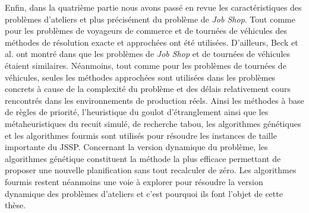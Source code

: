 Enfin, dans la quatrième partie nous avons passé en revue les caractéristiques des problèmes d'ateliers et plus précisément du problème de \textit{Job Shop}. Tout comme pour les problèmes de voyageurs de commerce et de tournées de véhicules des méthodes de résolution exacte et approchées ont été utilisées. D'ailleurs, Beck et al. ont montré dans \cite{Beck2003} que les problèmes de \textit{Job Shop} et de tournées de véhicules étaient similaires. Néanmoins, tout comme pour les problèmes de tournées de véhicules, seules les méthodes approchées sont utilisées dans les problèmes concrets à cause de la complexité du problème et des délais relativement cours rencontrés dans les environnements de production réels.
Ainsi les méthodes à base de règles de priorité, l'heuristique du goulot d'étranglement ainsi que les métaheuristiques du recuit simulé, de recherche tabou, les algorithmes génétiques et les algorithmes fourmis sont utilisés pour résoudre les instances de taille importante du JSSP.
Concernant la version dynamique du problème, les algorithmes génétique constituent la méthode la plus efficace permettant de proposer une nouvelle planification sans tout recalculer de zéro. Les algorithmes fourmis restent néanmoins une voie à explorer pour résoudre la version dynamique des problèmes d'ateliers et c'est pourquoi ils font l'objet de cette thèse.